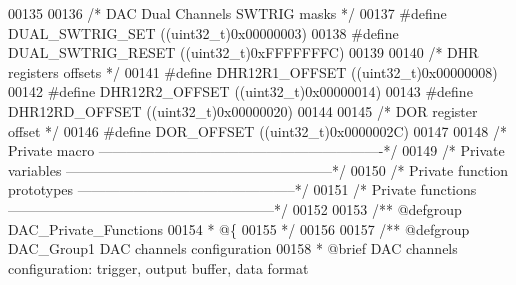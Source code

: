 \begin{DoxyCode}
00135 
00136 \textcolor{comment}{/* DAC Dual Channels SWTRIG masks */}
00137 \textcolor{preprocessor}{#}\textcolor{preprocessor}{define} \textcolor{preprocessor}{DUAL\_SWTRIG\_SET}            \textcolor{preprocessor}{(}\textcolor{preprocessor}{(}\textcolor{preprocessor}{uint32\_t}\textcolor{preprocessor}{)}0x00000003\textcolor{preprocessor}{)}
00138 \textcolor{preprocessor}{#}\textcolor{preprocessor}{define} \textcolor{preprocessor}{DUAL\_SWTRIG\_RESET}          \textcolor{preprocessor}{(}\textcolor{preprocessor}{(}\textcolor{preprocessor}{uint32\_t}\textcolor{preprocessor}{)}0xFFFFFFFC\textcolor{preprocessor}{)}
00139 
00140 \textcolor{comment}{/* DHR registers offsets */}
00141 \textcolor{preprocessor}{#}\textcolor{preprocessor}{define} \textcolor{preprocessor}{DHR12R1\_OFFSET}             \textcolor{preprocessor}{(}\textcolor{preprocessor}{(}\textcolor{preprocessor}{uint32\_t}\textcolor{preprocessor}{)}0x00000008\textcolor{preprocessor}{)}
00142 \textcolor{preprocessor}{#}\textcolor{preprocessor}{define} \textcolor{preprocessor}{DHR12R2\_OFFSET}             \textcolor{preprocessor}{(}\textcolor{preprocessor}{(}\textcolor{preprocessor}{uint32\_t}\textcolor{preprocessor}{)}0x00000014\textcolor{preprocessor}{)}
00143 \textcolor{preprocessor}{#}\textcolor{preprocessor}{define} \textcolor{preprocessor}{DHR12RD\_OFFSET}             \textcolor{preprocessor}{(}\textcolor{preprocessor}{(}\textcolor{preprocessor}{uint32\_t}\textcolor{preprocessor}{)}0x00000020\textcolor{preprocessor}{)}
00144 
00145 \textcolor{comment}{/* DOR register offset */}
00146 \textcolor{preprocessor}{#}\textcolor{preprocessor}{define} \textcolor{preprocessor}{DOR\_OFFSET}                 \textcolor{preprocessor}{(}\textcolor{preprocessor}{(}\textcolor{preprocessor}{uint32\_t}\textcolor{preprocessor}{)}0x0000002C\textcolor{preprocessor}{)}
00147 
00148 \textcolor{comment}{/* Private macro -------------------------------------------------------------*/}
00149 \textcolor{comment}{/* Private variables ---------------------------------------------------------*/}
00150 \textcolor{comment}{/* Private function prototypes -----------------------------------------------*/}
00151 \textcolor{comment}{/* Private functions ---------------------------------------------------------*/}
00152 
00153 \textcolor{comment}{/** @defgroup DAC\_Private\_Functions}
00154 \textcolor{comment}{  * @\{}
00155 \textcolor{comment}{  */}
00156 
00157 \textcolor{comment}{/** @defgroup DAC\_Group1 DAC channels configuration}
00158 \textcolor{comment}{ *  @brief   DAC channels configuration: trigger, output buffer, data format }

\end{DoxyCode}
